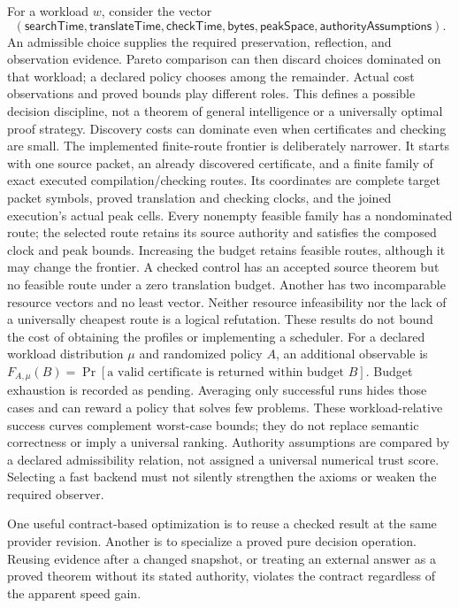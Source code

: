 \documentclass[11pt]{article}
\begin{document}
For a workload $w$, consider the vector
\[
 (\mathsf{searchTime},\mathsf{translateTime},\mathsf{checkTime},
   \mathsf{bytes},\mathsf{peakSpace},\mathsf{authorityAssumptions}).
\]
An admissible choice supplies the required preservation, reflection, and
observation evidence. Pareto comparison can then discard choices dominated
on that workload; a declared policy chooses among the remainder. Actual
cost observations and proved bounds play different roles. This defines
a possible decision discipline, not a theorem of general intelligence or
a universally optimal proof strategy. Discovery costs can dominate even
when certificates and checking are small.
The implemented finite-route frontier is deliberately narrower. It starts
with one source packet, an already discovered certificate, and a finite
family of exact executed compilation/checking routes. Its coordinates are
complete target packet symbols, proved translation and checking clocks,
and the joined execution's actual peak cells. Every nonempty feasible
family has a nondominated route; the selected route retains its source
authority and satisfies the composed clock and peak bounds. Increasing
the budget retains feasible routes, although it may change the frontier.
A checked control has an accepted source theorem but no feasible route
under a zero translation budget. Another has two incomparable resource
vectors and no least vector. Neither resource infeasibility nor the lack
of a universally cheapest route is a logical refutation. These results
do not bound the cost of obtaining the profiles or implementing a scheduler.
For a declared workload distribution $\mu$ and randomized policy $A$,
an additional observable is
$F_{A,\mu}(B)=\Pr[\text{a valid certificate is returned within budget }B]$.
Budget exhaustion is recorded as pending. Averaging only successful
runs hides those cases and can reward a policy that solves few problems.
These workload-relative success curves complement worst-case bounds;
they do not replace semantic correctness or imply a universal ranking.
Authority assumptions are compared by a declared admissibility relation,
not assigned a universal numerical trust score. Selecting a fast backend
must not silently strengthen the axioms or weaken the required observer.

One useful contract-based optimization is to reuse a checked result at
the same provider revision. Another is to specialize a proved pure
decision operation. Reusing evidence after a changed snapshot, or treating
an external answer as a proved theorem without its stated authority,
violates the contract regardless of the apparent speed gain.
\end{document}
